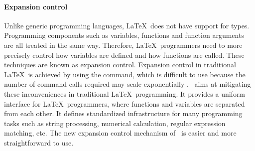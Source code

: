\documentclass{ltugboat}
\begin{document}
\paragraph{Expansion control} 
Unlike generic programming languages, \LaTeX\ does not have support for types.
Programming components such as variables, functions and function arguments are all treated in the same way.
Therefore, \LaTeX~programmers need to more precisely control how variables are defined and how functions are called. 
These techniques are known as expansion control. 
Expansion control in traditional \LaTeX~is achieved by using the  command, which is difficult to use because the number of  command calls required may scale exponentially \cite{bechtolsheim1988tutorial}.
\liii~aims at mitigating these inconveniences in traditional \LaTeX\ programming.
It provides a uniform interface for \LaTeX~programmers, where functions and variables are separated from each other. 
It defines standardized infrastructure for many programming tasks such as string processing, numerical calculation, regular expression matching, etc.
The new expansion control mechanism of \liii\ is easier and more straightforward to use.
\end{document}
